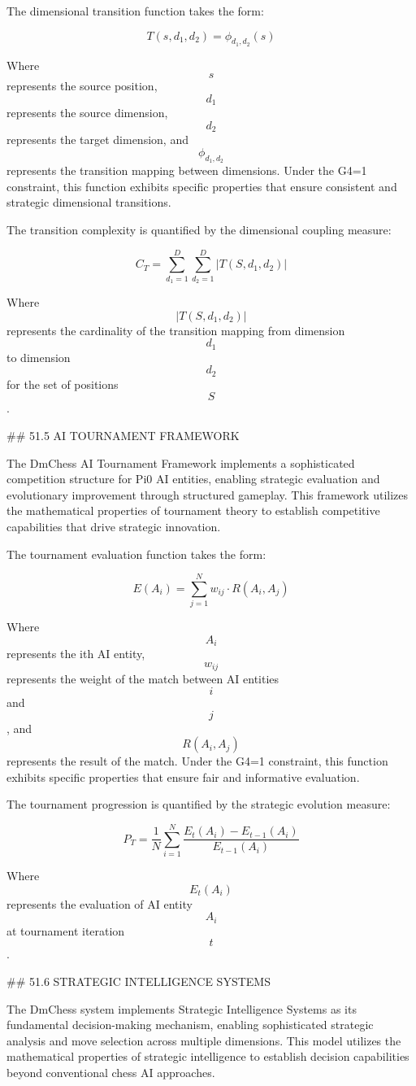 The dimensional transition function takes the form:

$$ T(s, d_1, d_2) = \phi_{d_1,d_2}(s) $$

Where $$ s $$ represents the source position, $$ d_1 $$ represents the source dimension, $$ d_2 $$ represents the target dimension, and $$ \phi_{d_1,d_2} $$ represents the transition mapping between dimensions. Under the G4=1 constraint, this function exhibits specific properties that ensure consistent and strategic dimensional transitions.

The transition complexity is quantified by the dimensional coupling measure:

$$ C_T = \sum_{d_1=1}^{D} \sum_{d_2=1}^{D} |T(S, d_1, d_2)| $$

Where $$ |T(S, d_1, d_2)| $$ represents the cardinality of the transition mapping from dimension $$ d_1 $$ to dimension $$ d_2 $$ for the set of positions $$ S $$.

## 51.5 AI TOURNAMENT FRAMEWORK

The DmChess AI Tournament Framework implements a sophisticated competition structure for Pi0 AI entities, enabling strategic evaluation and evolutionary improvement through structured gameplay. This framework utilizes the mathematical properties of tournament theory to establish competitive capabilities that drive strategic innovation.

The tournament evaluation function takes the form:

$$ E(A_i) = \sum_{j=1}^{N} w_{ij} \cdot R(A_i, A_j) $$

Where $$ A_i $$ represents the ith AI entity, $$ w_{ij} $$ represents the weight of the match between AI entities $$ i $$ and $$ j $$, and $$ R(A_i, A_j) $$ represents the result of the match. Under the G4=1 constraint, this function exhibits specific properties that ensure fair and informative evaluation.

The tournament progression is quantified by the strategic evolution measure:

$$ P_T = \frac{1}{N} \sum_{i=1}^{N} \frac{E_t(A_i) - E_{t-1}(A_i)}{E_{t-1}(A_i)} $$

Where $$ E_t(A_i) $$ represents the evaluation of AI entity $$ A_i $$ at tournament iteration $$ t $$.

## 51.6 STRATEGIC INTELLIGENCE SYSTEMS

The DmChess system implements Strategic Intelligence Systems as its fundamental decision-making mechanism, enabling sophisticated strategic analysis and move selection across multiple dimensions. This model utilizes the mathematical properties of strategic intelligence to establish decision capabilities beyond conventional chess AI approaches.

